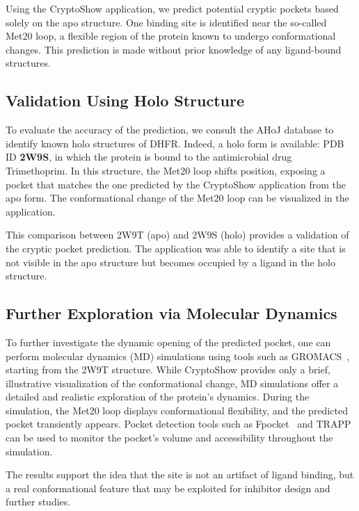 Using the CryptoShow application, we predict potential cryptic pockets based solely on the apo structure. One binding site is identified near the so-called Met20 loop, a flexible region of the protein known to undergo conformational changes. This prediction is made without prior knowledge of any ligand-bound structures. 

\subsection{Validation Using Holo Structure}
\label{subsec:holo-validation}

To evaluate the accuracy of the prediction, we consult the AHoJ database to identify known holo structures of DHFR. Indeed, a holo form is available: PDB ID \textbf{2W9S}, in which the protein is bound to the antimicrobial drug Trimethoprim. In this structure, the Met20 loop shifts position, exposing a pocket that matches the one predicted by the CryptoShow application from the apo form. The conformational change of the Met20 loop can be visualized in the application.

This comparison between 2W9T (apo) and 2W9S (holo) provides a validation of the cryptic pocket prediction. The application was able to identify a site that is not visible in the apo structure but becomes occupied by a ligand in the holo structure.

\subsection{Further Exploration via Molecular Dynamics}
\label{subsec:md-exploration}

To further investigate the dynamic opening of the predicted pocket, one can perform molecular dynamics (MD) simulations using tools such as GROMACS~\cite{van2005gromacs}, starting from the 2W9T structure. While CryptoShow provides only a brief, illustrative visualization of the conformational change, MD simulations offer a detailed and realistic exploration of the protein's dynamics. During the simulation, the Met20 loop displays conformational flexibility, and the predicted pocket transiently appears. Pocket detection tools such as Fpocket~\cite{le2009fpocket} and TRAPP~\cite{kokh2013trapp} can be used to monitor the pocket's volume and accessibility throughout the simulation.

The results support the idea that the site is not an artifact of ligand binding, but a real conformational feature that may be exploited for inhibitor design and further studies.

